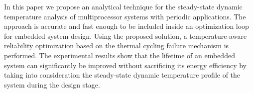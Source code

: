 In this paper we propose an analytical technique for the steady-state dynamic temperature analysis of multiprocessor systems with periodic applications. The approach is accurate and fast enough to be included inside an optimization loop for embedded system design. Using the proposed solution, a temperature-aware reliability optimization based on the thermal cycling failure mechanism is performed. The experimental results show that the lifetime of an embedded system can significantly be improved without sacrificing its energy efficiency by taking into consideration the steady-state dynamic temperature profile of the system during the design stage.
